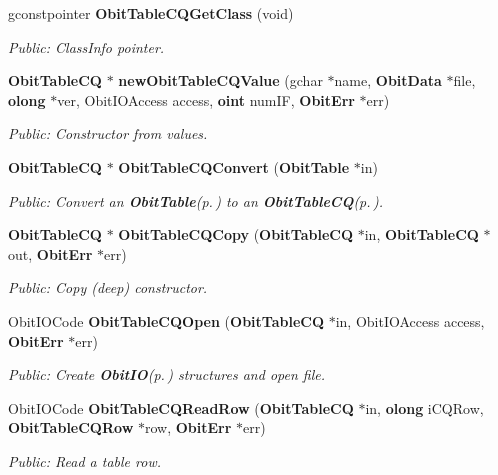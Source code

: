 \begin{CompactItemize}
gconstpointer {\bf Obit\-Table\-CQGet\-Class} (void)
\begin{CompactList}\small\item\em Public: Class\-Info pointer. \item\end{CompactList}\item 
{\bf Obit\-Table\-CQ} $\ast$ {\bf new\-Obit\-Table\-CQValue} (gchar $\ast$name, {\bf Obit\-Data} $\ast$file, {\bf olong} $\ast$ver, Obit\-IOAccess access, {\bf oint} num\-IF, {\bf Obit\-Err} $\ast$err)
\begin{CompactList}\small\item\em Public: Constructor from values. \item\end{CompactList}\item 
{\bf Obit\-Table\-CQ} $\ast$ {\bf Obit\-Table\-CQConvert} ({\bf Obit\-Table} $\ast$in)
\begin{CompactList}\small\item\em Public: Convert an {\bf Obit\-Table}{\rm (p.\,\pageref{structObitTable})} to an {\bf Obit\-Table\-CQ}{\rm (p.\,\pageref{structObitTableCQ})}. \item\end{CompactList}\item 
{\bf Obit\-Table\-CQ} $\ast$ {\bf Obit\-Table\-CQCopy} ({\bf Obit\-Table\-CQ} $\ast$in, {\bf Obit\-Table\-CQ} $\ast$out, {\bf Obit\-Err} $\ast$err)
\begin{CompactList}\small\item\em Public: Copy (deep) constructor. \item\end{CompactList}\item 
Obit\-IOCode {\bf Obit\-Table\-CQOpen} ({\bf Obit\-Table\-CQ} $\ast$in, Obit\-IOAccess access, {\bf Obit\-Err} $\ast$err)
\begin{CompactList}\small\item\em Public: Create {\bf Obit\-IO}{\rm (p.\,\pageref{structObitIO})} structures and open file. \item\end{CompactList}\item 
Obit\-IOCode {\bf Obit\-Table\-CQRead\-Row} ({\bf Obit\-Table\-CQ} $\ast$in, {\bf olong} i\-CQRow, {\bf Obit\-Table\-CQRow} $\ast$row, {\bf Obit\-Err} $\ast$err)
\begin{CompactList}\small\item\em Public: Read a table row. \item\end{CompactList}\item 

\end{CompactItemize}
